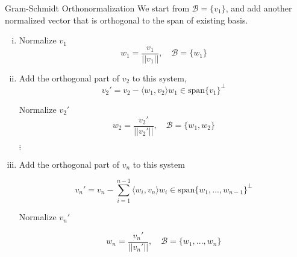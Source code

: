 \documentclass[hyperref={pdfpagelabels=true}]{beamer}
\newcommand{\<}{\langle}
\renewcommand{\>}{\rangle}
\begin{document}
\begin{frame}{Gram-Schmidt Orthonormalization}
    We start from $\mathcal{B} = \{v_{1}\}$, and add another normalized vector that is orthogonal to the span of existing basis.
    \begin{enumerate}[(i)]
        \item Normalize $v_{1}$ 
        \[ w_{1} = \frac{v_{1}}{||v_{1}||}, \quad\mathcal{B} = \{w_{1}\}\]
        \item Add the orthogonal part of $v_{2}$ to this system,
        \[v_{2}' = v_{2}-\<w_{1},v_{2}\>w_{1} \in \text{span}\{v_{1}\}^{\bot}\]
        \begin{spacing}{0.02}
        Normalize $v_{2}'$ 
        \[w_{2} = \frac{v_{2}'}{||v_{2}'||},\quad \mathcal{B} = \{w_{1},w_{2}\}\]
        \end{spacing}
        $\vdots$
        \item Add the orthogonal part of $v_{n}$ to this system
        \begin{spacing}{0.3}
        \[v_{n}' = v_{n}-\sum_{i = 1}^{n-1}\<w_{i},v_{n}\>w_{i} \in \text{span}\{w_{1},...,w_{n-1}\}^{\bot}\]
        \end{spacing}
        \vspace{0.5em}
        Normalize $v_{n}'$ 
        \begin{spacing}{0.05}
        \[ w_{n} = \frac{v_{n}'}{||v_{n}'||}, \quad \mathcal{B} = \{w_{1},...,w_{n}\}\]
        \end{spacing}
        \end{enumerate}
\end{frame}
\end{document}

